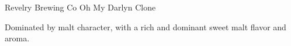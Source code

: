 \documentclass[parskip=half,fontsize=9pt,oneside]{scrbook}
\begin{document}
\mainmatter


\begin{recipe}{Revelry Brewing Co Oh My Darlyn Clone}

\begin{aboutblock}
Dominated by malt character, with a rich and dominant sweet malt flavor and aroma.
\sourceaha
\end{aboutblock}


\begin{methodandtiming}

\begin{mashsteps}
\end{mashsteps}

\begin{fermentationsteps}
\end{fermentationsteps}

\end{methodandtiming}

\recipebreak

\begin{ingredientsblock}

\begin{malts}
\end{malts}

\begin{hops}
\end{hops}


\end{ingredientsblock}

\end{recipe}


\end{document}
